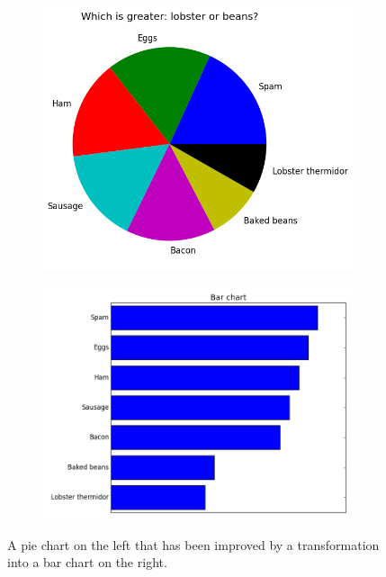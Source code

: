 \begin{figure}
\centering
\begin{subfigure}{.45\textwidth}
\centering
\includegraphics[width=\textwidth]{pie_chart_sorted.png}
\end{subfigure}
\begin{subfigure}{.45\textwidth}
\centering
\includegraphics[width=\textwidth]{bar_chart_horizontal_sorted.png}
\end{subfigure}
\caption{A pie chart on the left that has been improved by a transformation into a bar chart on the right.}
\label{fig:pievsbar}
\end{figure}


